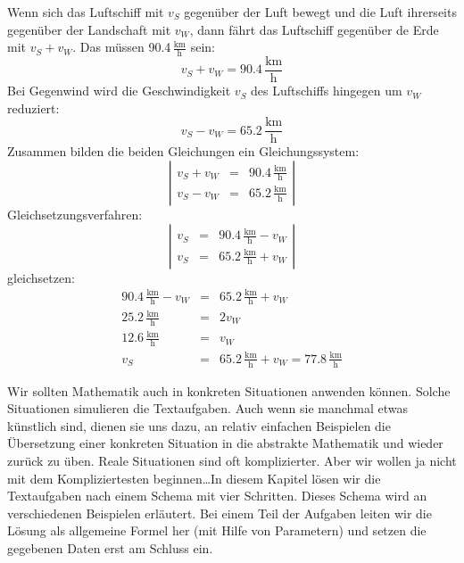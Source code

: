 \documentclass[%
11pt,%
twoside,%
titlepage,%
german,%
]{scrartcl}
\newcommand{\ufrac}[2]{\ensuremath{\,\frac{\mathrm{#1}}{\mathrm{#2}}}}
\begin{document}
\begin{enumerate}
\begin{enumerate}
  Wenn sich das Luftschiff mit $v_S$ gegen\"uber der Luft bewegt und die Luft ihrerseits gegen\"uber der Landschaft mit $v_W$, dann f\"ahrt das Luftschiff gegen\"uber de Erde mit $v_S+v_W$. Das m\"ussen 90.4\ufrac{km}{h} sein:
  \begin{displaymath}
    v_S + v_W = 90.4\ufrac{km}{h}
  \end{displaymath}
  Bei Gegenwind wird die Geschwindigkeit $v_S$ des Luftschiffs hingegen um $v_W$ reduziert:
  \begin{displaymath}
    v_S - v_W = 65.2\ufrac{km}{h}
  \end{displaymath}
  Zusammen bilden die beiden Gleichungen ein Gleichungssystem:
    \begin{displaymath}
      \left| 
        \begin{array}{rcl}
          v_S + v_W & = & 90.4\ufrac{km}{h} \\
          v_S - v_W & = & 65.2\ufrac{km}{h}
        \end{array} \right|
    \end{displaymath}
Gleichsetzungsverfahren:
    \begin{displaymath}
      \left| 
        \begin{array}{rcl}
          v_S & = & 90.4\ufrac{km}{h}-v_W \\
          v_S & = & 65.2\ufrac{km}{h}+v_W
        \end{array} \right|
    \end{displaymath}
gleichsetzen:
\begin{eqnarray*}
90.4\ufrac{km}{h}-v_W & = & 65.2\ufrac{km}{h}+v_W \\
25.2\ufrac{km}{h} & = & 2v_W \\
12.6\ufrac{km}{h} & = & v_W \\
v_S & = & 65.2\ufrac{km}{h}+v_W=77.8\ufrac{km}{h}
\end{eqnarray*}
  \end{enumerate}

\end{enumerate}

\pagebreak

Wir sollten Mathematik auch in konkreten Situationen anwenden k\"onnen. Solche Situationen simulieren die Textaufgaben. Auch wenn sie manchmal etwas k\"unstlich sind, dienen sie uns dazu, an relativ einfachen Beispielen die \"Ubersetzung einer konkreten Situation in die abstrakte Mathematik und wieder zur\"uck zu \"uben. Reale Situationen sind oft komplizierter. Aber wir wollen ja nicht mit dem Kompliziertesten beginnen\dots In diesem Kapitel l\"osen wir die Textaufgaben nach einem Schema mit vier Schritten. Dieses Schema wird an verschiedenen Beispielen erl\"autert. Bei einem Teil der Aufgaben leiten wir die L\"osung als allgemeine Formel her (mit Hilfe von Parametern) und setzen die gegebenen Daten erst am Schluss ein.
\end{document}
